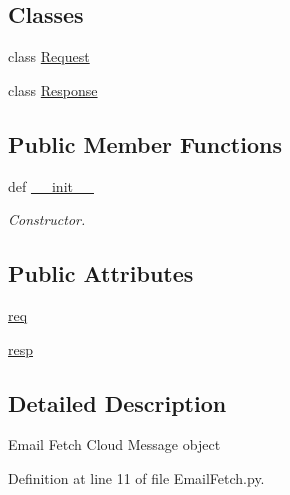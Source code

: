 \subsection*{Classes}
\begin{DoxyCompactItemize}
\item 
class \hyperlink{classRappCloud_1_1CloudMsgs_1_1EmailFetch_1_1EmailFetch_1_1Request}{Request}
\item 
class \hyperlink{classRappCloud_1_1CloudMsgs_1_1EmailFetch_1_1EmailFetch_1_1Response}{Response}
\end{DoxyCompactItemize}
\subsection*{Public Member Functions}
\begin{DoxyCompactItemize}
\item 
def \hyperlink{classRappCloud_1_1CloudMsgs_1_1EmailFetch_1_1EmailFetch_adbceb729e26ddac473672021d92bffd7}{\-\_\-\-\_\-init\-\_\-\-\_\-}
\begin{DoxyCompactList}\small\item\em Constructor. \end{DoxyCompactList}\end{DoxyCompactItemize}
\subsection*{Public Attributes}
\begin{DoxyCompactItemize}
\item 
\hyperlink{classRappCloud_1_1CloudMsgs_1_1EmailFetch_1_1EmailFetch_a9fa3be9b3fc247e5b491444afefb6d57}{req}
\item 
\hyperlink{classRappCloud_1_1CloudMsgs_1_1EmailFetch_1_1EmailFetch_af2a52f89e0c5c915b052b2766023fbe4}{resp}
\end{DoxyCompactItemize}


\subsection{Detailed Description}
\begin{DoxyVerb}Email Fetch Cloud Message object \end{DoxyVerb}
 

Definition at line 11 of file Email\-Fetch.\-py.



